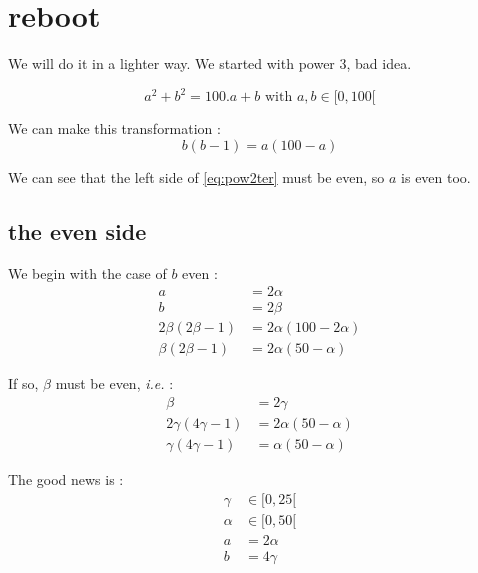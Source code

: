 
\section{reboot}
We will do it in a lighter way. We started with power 3, bad idea. 

\begin{equation}\label{eq:pow2}
	a^2 + b^2 = 100.a + b \text{ with } a, b \in [0, 100[
\end{equation}

We can make this transformation :
\begin{equation}\label{eq:pow2bis}
	b(b-1) = a(100 - a)
\end{equation}

We can see that the left side of \eqref{eq:pow2ter} must be even, so $a$ is even too.

\subsection{the even side}
We begin with the case of $b$ even :
\begin{equation}\label{eq:pow2ter}
\begin{split}
	a &= 2 \alpha \\
	b &= 2 \beta \\
	2 \beta(2 \beta - 1) &= 2 \alpha(100 - 2 \alpha) \\
	\beta(2\beta - 1) &= 2 \alpha(50 - \alpha)
\end{split}
\end{equation}

If so, $\beta$ must be even, \emph{i.e.} :
\begin{equation}\label{eq:pow2:4}
\begin{split}
	\beta &= 2 \gamma \\
	2 \gamma (4 \gamma - 1) &= 2 \alpha (50 - \alpha) \\
	\gamma (4 \gamma - 1) &= \alpha (50 - \alpha)
\end{split}
\end{equation}

The good news is : 
\begin{equation}\label{eq:pow2:5}
\begin{split}
	\gamma &\in [0, 25[ \\
	\alpha &\in [0, 50[ \\
	a &= 2 \alpha \\
	b &= 4 \gamma
\end{split}
\end{equation}

